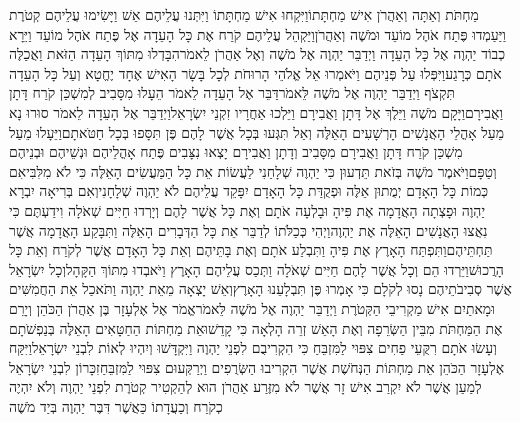 \documentclass[../main/main.tex]{subfiles}
\begin{document}
\begin{multicols}{\ncols}
מַחְתֹּת וְאַתָּה וְאַהֲרֹן אִישׁ מַחְתָּתוֹ\PreVerseSpace{}וַיִּקְחוּ אִישׁ מַחְתָּתוֹ וַיִּתְּנוּ עֲלֵיהֶם אֵשׁ וַיָּשִׂימוּ עֲלֵיהֶם קְטֹרֶת וַיַּעַמְדוּ פֶּתַח אֹהֶל מוֹעֵד וּמֹשֶׁה וְאַהֲרֹן\PreVerseSpace{}וַיַּקְהֵל עֲלֵיהֶם קֹרַח אֶת כָּל הָעֵדָה אֶל פֶּתַח אֹהֶל מוֹעֵד וַיֵּרָא כְבוֹד יַהְוֶה אֶל כָּל הָעֵדָה \ClosedSection{}וַיְדַבֵּר יַהְוֶה אֶל מֹשֶׁה וְאֶל אַהֲרֹן לֵאמֹר\PreVerseSpace{}הִבָּדְלוּ מִתּוֹךְ הָעֵדָה הַזֹּאת וַאֲכַלֶּה אֹתָם כְּרָגַע\PreVerseSpace{}וַיִּפְּלוּ עַל פְּנֵיהֶם וַיֹּאמְרוּ אֵל אֱלֹהֵי הָרוּחֹת לְכָל בָּשָׂר הָאִישׁ אֶחָד יֶחֱטָא וְעַל כָּל הָעֵדָה תִּקְצֹף \ClosedSection{}וַיְדַבֵּר יַהְוֶה אֶל מֹשֶׁה לֵּאמֹר\PreVerseSpace{}דַּבֵּר אֶל הָעֵדָה לֵאמֹר הֵעָלוּ מִסָּבִיב לְמִשְׁכַּן קֹרַח דָּתָן וַאֲבִירָם\PreVerseSpace{}וַיָּקָם מֹשֶׁה וַיֵּלֶךְ אֶל דָּתָן וַאֲבִירָם וַיֵּלְכוּ אַחֲרָיו זִקְנֵי יִשְׂרָאֵל\PreVerseSpace{}וַיְדַבֵּר אֶל הָעֵדָה לֵאמֹר סוּרוּ נָא מֵעַל אָהֳלֵי הָאֲנָשִׁים הָרְשָׁעִים הָאֵלֶּה וְאַל תִּגְּעוּ בְּכָל אֲשֶׁר לָהֶם פֶּן תִּסָּפוּ בְּכָל חַטֹּאתָם\PreVerseSpace{}וַיֵּעָלוּ מֵעַל מִשְׁכַּן קֹרַח דָּתָן וַאֲבִירָם מִסָּבִיב וְדָתָן וַאֲבִירָם יָצְאוּ נִצָּבִים פֶּתַח אָהֳלֵיהֶם וּנְשֵׁיהֶם וּבְנֵיהֶם וְטַפָּם\PreVerseSpace{}וַיֹּאמֶר מֹשֶׁה בְּזֹאת תֵּדְעוּן כִּי יַהְוֶה שְׁלָחַנִי לַעֲשׂוֹת אֵת כָּל הַמַּעֲשִׂים הָאֵלֶּה כִּי לֹא מִלִּבִּי\PreVerseSpace{}אִם כְּמוֹת כָּל הָאָדָם יְמֻתוּן אֵלֶּה וּפְקֻדַּת כָּל הָאָדָם יִפָּקֵד עֲלֵיהֶם לֹא יַהְוֶה שְׁלָחָנִי\PreVerseSpace{}וְאִם בְּרִיאָה יִבְרָא יַהְוֶה וּפָצְתָה הָאֲדָמָה אֶת פִּיהָ וּבָלְעָה אֹתָם וְאֶת כָּל אֲשֶׁר לָהֶם וְיָרְדוּ חַיִּים שְׁאֹלָה וִידַעְתֶּם כִּי נִאֲצוּ הָאֲנָשִׁים הָאֵלֶּה אֶת יַהְוֶה\PreVerseSpace{}וַיְהִי כְּכַלֹּתוֹ לְדַבֵּר אֵת כָּל הַדְּבָרִים הָאֵלֶּה וַתִּבָּקַע הָאֲדָמָה אֲשֶׁר תַּחְתֵּיהֶם\PreVerseSpace{}וַתִּפְתַּח הָאָרֶץ אֶת פִּיהָ וַתִּבְלַע אֹתָם וְאֶת בָּתֵּיהֶם וְאֵת כָּל הָאָדָם אֲשֶׁר לְקֹרַח וְאֵת כָּל הָרֲכוּשׁ\PreVerseSpace{}וַיֵּרְדוּ הֵם וְכָל אֲשֶׁר לָהֶם חַיִּים שְׁאֹלָה וַתְּכַס עֲלֵיהֶם הָאָרֶץ וַיֹּאבְדוּ מִתּוֹךְ הַקָּהָל\PreVerseSpace{}וְכָל יִשְׂרָאֵל אֲשֶׁר סְבִיבֹתֵיהֶם נָסוּ לְקֹלָם כִּי אָמְרוּ פֶּן תִּבְלָעֵנוּ הָאָרֶץ\PreVerseSpace{}וְאֵשׁ יָצְאָה מֵאֵת יַהְוֶה וַתֹּאכַל אֵת הַחֲמִשִּׁים וּמָאתַיִם אִישׁ מַקְרִיבֵי הַקְּטֹרֶת \ClosedSection{}וַיְדַבֵּר יַהְוֶה אֶל מֹשֶׁה לֵּאמֹר\PreVerseSpace{}אֱמֹר אֶל אֶלְעָזָר בֶּן אַהֲרֹן הַכֹּהֵן וְיָרֵם אֶת הַמַּחְתֹּת מִבֵּין הַשְּׂרֵפָה וְאֶת הָאֵשׁ זְרֵה הָלְאָה כִּי קָדֵשׁוּ\PreVerseSpace{}אֵת מַחְתּוֹת הַחַטָּאִים הָאֵלֶּה בְּנַפְשֹׁתָם וְעָשׂוּ אֹתָם רִקֻּעֵי פַחִים צִפּוּי לַמִּזְבֵּחַ כִּי הִקְרִיבֻם לִפְנֵי יַהְוֶה וַיִּקְדָּשׁוּ וְיִהְיוּ לְאוֹת לִבְנֵי יִשְׂרָאֵל\PreVerseSpace{}וַיִּקַּח אֶלְעָזָר הַכֹּהֵן אֵת מַחְתּוֹת הַנְּחֹשֶׁת אֲשֶׁר הִקְרִיבוּ הַשְּׂרֻפִים וַיְרַקְּעוּם צִפּוּי לַמִּזְבֵּחַ\PreVerseSpace{}זִכָּרוֹן לִבְנֵי יִשְׂרָאֵל לְמַעַן אֲשֶׁר לֹא יִקְרַב אִישׁ זָר אֲשֶׁר לֹא מִזֶּרַע אַהֲרֹן הוּא לְהַקְטִיר קְטֹרֶת לִפְנֵי יַהְוֶה וְלֹא יִהְיֶה כְקֹרַח וְכַעֲדָתוֹ כַּאֲשֶׁר דִּבֶּר יַהְוֶה בְּיַד מֹשֶׁה 
\end{multicols}
\end{document}
